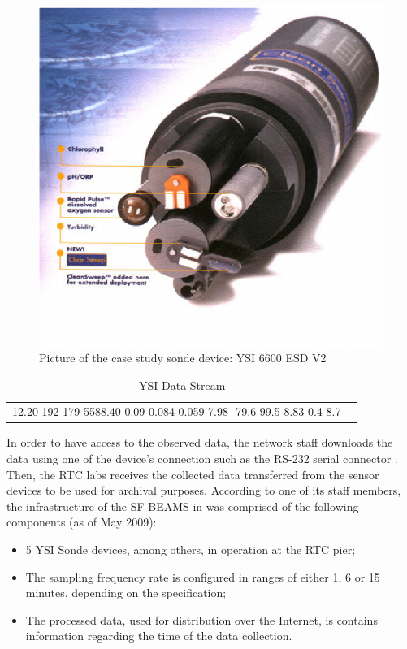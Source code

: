 \begin{figure}[!b]
  \centering
  \includegraphics[scale=0.7]{../diagrams/ysi-device}
  \caption{Picture of the case study sonde device: YSI 6600 ESD V2}
  \label{fig:ysi-device}
\end{figure}

\begin{table}[!b]
    \caption{YSI Data Stream}
    \begin{center}
        \begin{tabular}{lr}
  12.20    192    179 5588.40   0.09   0.084   0.059  7.98   -79.6   99.5  8.83 
  0.4     8.7
        \end{tabular}
    \end{center}
    \label{tab:ysi-data-stream}
\end{table}

In order to have access to the observed data, the network staff downloads the
data using one of the device's connection such as the RS-232 serial connector
\cite{rs232}. Then, the RTC labs receives the collected data transferred from
the sensor devices to be used for archival purposes. According to one of its
staff members, the infrastructure of the SF-BEAMS in was comprised of
the following components (as of May 2009):

\begin{itemize}
  \item 5 YSI Sonde devices, among others, in operation at the RTC pier;
  \item The sampling frequency rate is configured in ranges of either 1, 6 or
  15 minutes, depending on the specification;
  \item The processed data, used for distribution over the Internet, is
   contains information regarding the time of the data collection.
\end{itemize}

